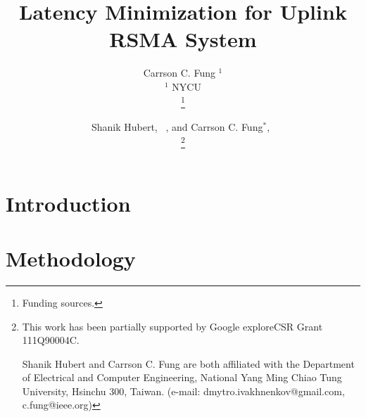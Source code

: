 \documentclass[a4paper, 12pt, onecolumn, journal, twoside, draftclsnofoot]{IEEEtran}
\title{\vspace{-0.2em} \huge Latency Minimization for Uplink RSMA System}
\author{Carrson C. Fung $^1$ \\ %
$^1$ NYCU  \\
\thanks{Funding sources.}
}
\author{Shanik Hubert, ~\IEEEmembership{Student Member,~IEEE}, and Carrson C. Fung$^*$,~\IEEEmembership{Member,~IEEE} \\
\thanks{This work has been partially supported by Google exploreCSR Grant 111Q90004C.

Shanik Hubert and Carrson C. Fung  are both affiliated with the Department of Electrical and Computer Engineering, National Yang Ming Chiao Tung University, Hsinchu 300, Taiwan. (e-mail: dmytro.ivakhnenkov@gmail.com, c.fung@ieee.org)}
}
\begin{document}
\maketitle

\begin{abstract}
\end{abstract}

\begin{IEEEkeywords}
\end{IEEEkeywords}

\section{Introduction}	\label{intro}


  
\section{Methodology} \label{sec_meth}
\end{document}
